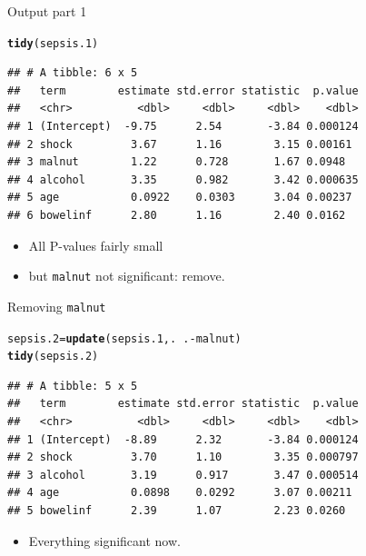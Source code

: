 \documentclass[unknownkeysallowed]{beamer}\usepackage[]{graphicx}\usepackage[]{color}
\makeatletter
\newcommand{\hlopt}[1]{\textcolor[rgb]{0,0,0}{#1}}%
\newcommand{\hlstd}[1]{\textcolor[rgb]{0.345,0.345,0.345}{#1}}%
\newcommand{\hlkwb}[1]{\textcolor[rgb]{0.69,0.353,0.396}{#1}}%
\newcommand{\hlkwd}[1]{\textcolor[rgb]{0.737,0.353,0.396}{\textbf{#1}}}%
\newenvironment{kframe}{%
 \def\at@end@of@kframe{}%
 \ifinner\ifhmode%
  \def\at@end@of@kframe{\end{minipage}}%
  \begin{minipage}{\columnwidth}%
 \fi\fi%
 \def\FrameCommand##1{\hskip\@totalleftmargin \hskip-\fboxsep
 \colorbox{shadecolor}{##1}\hskip-\fboxsep
     \hskip-\linewidth \hskip-\@totalleftmargin \hskip\columnwidth}%
 \MakeFramed {\advance\hsize-\width
   \@totalleftmargin\z@ \linewidth\hsize
   \@setminipage}}%
 {\par\unskip\endMakeFramed%
 \at@end@of@kframe}
\newenvironment{knitrout}{}{} %
\makeatother
\begin{document}
\begin{frame}[fragile]{Output part 1}

 
\begin{knitrout}\footnotesize
{}\color{fgcolor}\begin{kframe}
\begin{alltt}
\hlkwd{tidy}\hlstd{(sepsis.1)}
\end{alltt}
\begin{verbatim}
## # A tibble: 6 x 5
##   term        estimate std.error statistic  p.value
##   <chr>          <dbl>     <dbl>     <dbl>    <dbl>
## 1 (Intercept)  -9.75      2.54       -3.84 0.000124
## 2 shock         3.67      1.16        3.15 0.00161 
## 3 malnut        1.22      0.728       1.67 0.0948  
## 4 alcohol       3.35      0.982       3.42 0.000635
## 5 age           0.0922    0.0303      3.04 0.00237 
## 6 bowelinf      2.80      1.16        2.40 0.0162
\end{verbatim}
\end{kframe}
\end{knitrout}

\begin{itemize}
\item All P-values fairly small
\item but \texttt{malnut} not significant: remove.
\end{itemize}


\end{frame}

\begin{frame}[fragile]{Removing \texttt{malnut}}

 
\begin{knitrout}\footnotesize
{}\color{fgcolor}\begin{kframe}
\begin{alltt}
\hlstd{sepsis.2}\hlkwb{=}\hlkwd{update}\hlstd{(sepsis.1,.}\hlopt{~}\hlstd{.}\hlopt{-}\hlstd{malnut)}
\hlkwd{tidy}\hlstd{(sepsis.2)}
\end{alltt}
\begin{verbatim}
## # A tibble: 5 x 5
##   term        estimate std.error statistic  p.value
##   <chr>          <dbl>     <dbl>     <dbl>    <dbl>
## 1 (Intercept)  -8.89      2.32       -3.84 0.000124
## 2 shock         3.70      1.10        3.35 0.000797
## 3 alcohol       3.19      0.917       3.47 0.000514
## 4 age           0.0898    0.0292      3.07 0.00211 
## 5 bowelinf      2.39      1.07        2.23 0.0260
\end{verbatim}
\end{kframe}
\end{knitrout}

\begin{itemize}
\item Everything significant now.
\end{itemize}
  
 
  
\end{frame}
\end{document}
